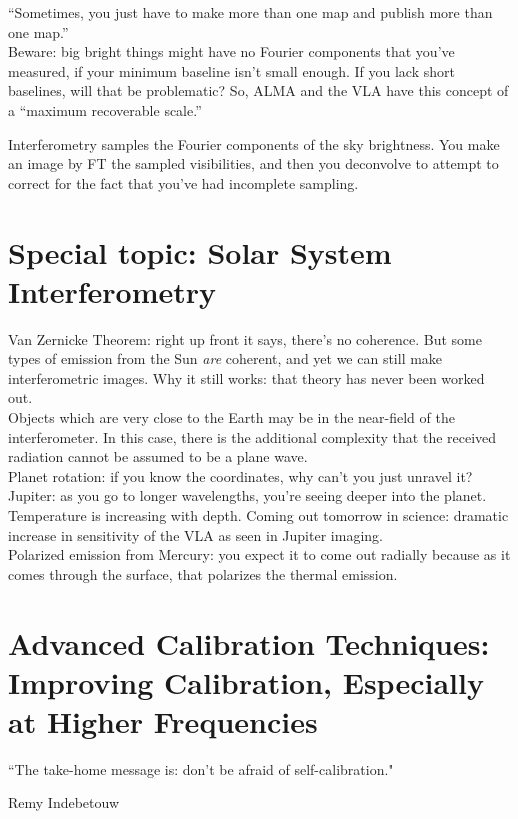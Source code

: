 \documentclass[a4paper]{article}
\begin{document}
``Sometimes, you just have to make more than one map and publish more than one map.'' \\

Beware: big bright things might have no Fourier components that you've measured, if your minimum baseline isn't small enough. If you lack short baselines, will that be problematic? So, ALMA and the VLA have this concept of a ``maximum recoverable scale.''

Interferometry samples the Fourier components of the sky brightness. You make an image by FT the sampled visibilities, and then you deconvolve to attempt to correct for the fact that you've had incomplete sampling. 

\section{Special topic: Solar System Interferometry}

Van Zernicke Theorem: right up front it says, there's no coherence.
But some types of emission from the Sun \emph{are} coherent, and yet we can still make interferometric images. Why it still works: that theory has never been worked out. \\

Objects which are very close to the Earth may be in the near-field of the interferometer. In this case, there is the additional complexity that the received radiation cannot be assumed to be a plane wave. \\

Planet rotation: if you know the coordinates, why can't you just unravel it? \\

Jupiter: as you go to longer wavelengths, you're seeing deeper into the planet. Temperature is increasing with depth. Coming out tomorrow in science: dramatic increase in sensitivity of the VLA as seen in Jupiter imaging. \\

Polarized emission from Mercury: you expect it to come out radially because as it comes through the surface, that polarizes the thermal emission. 

\section{Advanced Calibration Techniques: Improving Calibration, Especially at Higher Frequencies}

\epigraph{``The take-home message is: don't be afraid of self-calibration."}{Remy Indebetouw} 
\end{document}
